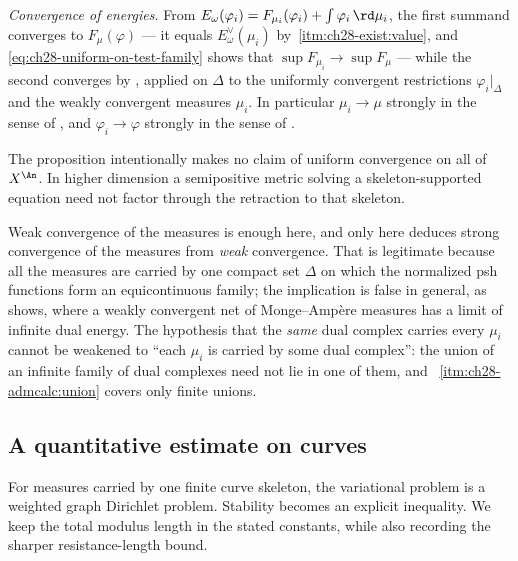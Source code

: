 \emph{Convergence of energies.}  From
\(E_\omega(\varphi_i)=F_{\mu_i}(\varphi_i)+\int\varphi_i\,\rd\mu_i\), the
first summand converges to \(F_\mu(\varphi)\) --- it equals
\(E^\vee_\omega(\mu_i)\) by
\,\cref{itm:ch28-exist:value}, and
\eqref{eq:ch28-uniform-on-test-family} shows that
\(\sup F_{\mu_i}\to\sup F_\mu\) --- while the second converges by
, applied on \(\Delta\) to the uniformly
convergent restrictions \(\varphi_i|_\Delta\) and the weakly convergent
measures \(\mu_i\).  In particular \(\mu_i\to\mu\) strongly in the sense of
, and
\(\varphi_i\to\varphi\) strongly in the sense of .

The proposition intentionally makes no claim of uniform convergence on all
of \(X^{\An}\).  In higher dimension a semipositive metric solving a
skeleton-supported equation need not factor through the retraction to that
skeleton.

\begin{warning}{Weak convergence of the measures is enough here, and only
here}
 deduces strong convergence of the
measures from \emph{weak} convergence.  That is legitimate because all the
measures are carried by one compact set \(\Delta\) on which the normalized
psh functions form an equicontinuous family; the implication is false in
general, as  shows, where a weakly
convergent net of Monge--Amp\`ere measures has a limit of infinite dual
energy.  The hypothesis that the \emph{same} dual complex carries every
\(\mu_i\) cannot be weakened to ``each \(\mu_i\) is carried by some dual
complex'': the union of an infinite family of dual complexes need not lie in
one of them, and \,%
\cref{itm:ch28-admcalc:union} covers only finite unions.
\end{warning}

\subsection{A quantitative estimate on curves}
\label{sec:ch28-curve-stability}

For measures carried by one finite curve skeleton, the variational problem
is a weighted graph Dirichlet problem.  Stability becomes an explicit
inequality.  We keep the total modulus length in the stated constants,
while also recording the sharper resistance-length bound.

